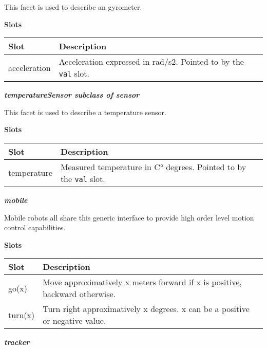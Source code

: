 \documentclass[a4paper]{article}
\begin{document}
{\sffamily
This facet is used to describe an gyrometer.}

{\sffamily\bfseries
Slots}

\begin{flushleft}
\tablehead{}
\begin{supertabular}{|m{3.651cm}|m{11.639cm}|}
\hline
{}\sffamily\bfseries Slot &
\sffamily\bfseries Description\\\hline
{} acceleration &
\sffamily Acceleration expressed in rad/s2.
Pointed to by the \texttt{val} slot.\\\hline
\end{supertabular}
\end{flushleft}
{\sffamily\bfseries\itshape
 temperatureSensor  \textmd{subclass of sensor}}

{\sffamily
This facet is used to describe a temperature sensor.}

{\sffamily\bfseries
Slots}

\begin{flushleft}
\tablehead{}
\begin{supertabular}{|m{2.98cm}|m{12.31cm}|}
\hline
{}\sffamily\bfseries Slot &
\sffamily\bfseries Description\\\hline
{} temperature &
\sffamily Measured temperature in C° degrees.
Pointed to by the \texttt{val} slot.\\\hline
\end{supertabular}
\end{flushleft}
{\sffamily\bfseries\itshape
mobile}

{\sffamily
Mobile robots all share this generic interface to provide high order
level motion control capabilities.}

{\sffamily\bfseries
Slots}

\begin{flushleft}
\tablehead{}
\begin{supertabular}{|m{3.293cm}|m{11.997cm}|}
\hline
{}\sffamily\bfseries Slot &
\sffamily\bfseries Description\\\hline
{} go(x) &
\sffamily Move approximatively x meters forward
if x is positive, backward otherwise.\\\hline
{} turn(x) &
\sffamily Turn right approximatively x degrees.
x can be a positive or negative value.\\\hline
\end{supertabular}
\end{flushleft}
{\sffamily\bfseries\itshape
tracker}
\end{document}
